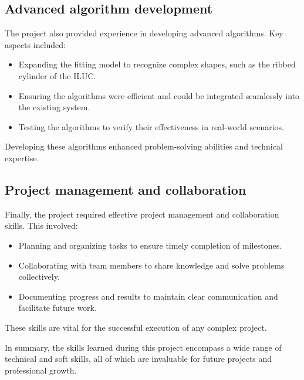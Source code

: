 \subsection{Advanced algorithm development}
The project also provided experience in developing advanced algorithms. Key aspects included:
\begin{itemize}
    \item Expanding the fitting model to recognize complex shapes, such as the ribbed cylinder of the ILUC.
    \item Ensuring the algorithms were efficient and could be integrated seamlessly into the existing system.
    \item Testing the algorithms to verify their effectiveness in real-world scenarios.
\end{itemize}
Developing these algorithms enhanced problem-solving abilities and technical expertise.

\subsection{Project management and collaboration}
Finally, the project required effective project management and collaboration skills. This involved:
\begin{itemize}
    \item Planning and organizing tasks to ensure timely completion of milestones.
    \item Collaborating with team members to share knowledge and solve problems collectively.
    \item Documenting progress and results to maintain clear communication and facilitate future work.
\end{itemize}
These skills are vital for the successful execution of any complex project.

In summary, the skills learned during this project encompass a wide range of technical and soft skills, all of which are invaluable for future projects and professional growth.